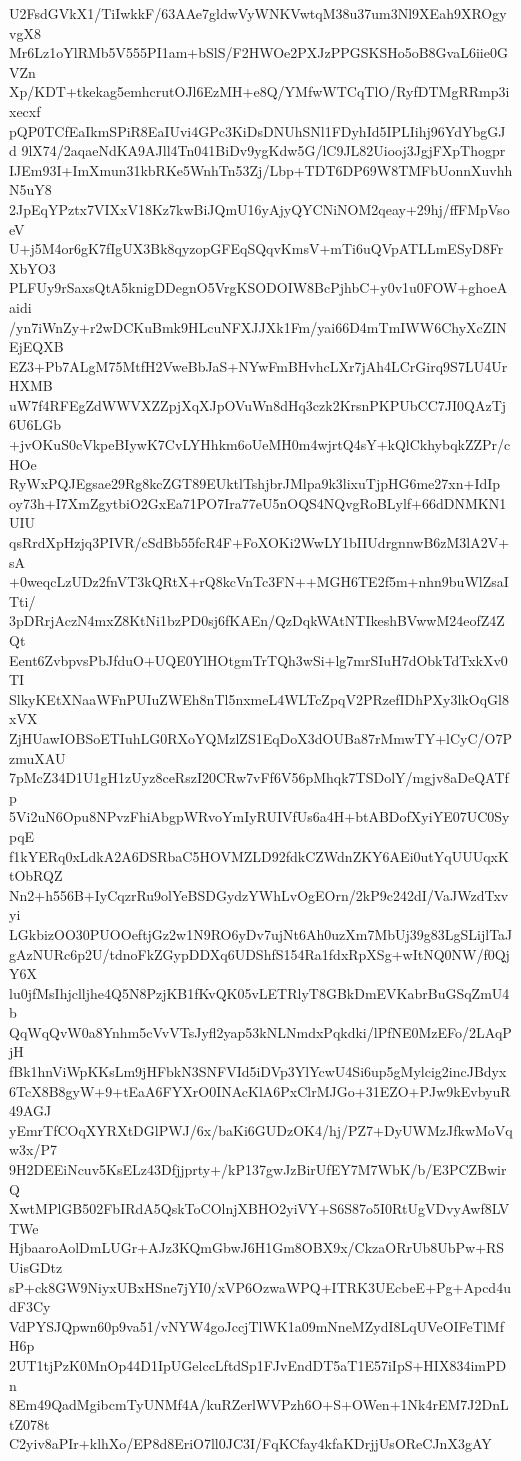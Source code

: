 U2FsdGVkX1/TiIwkkF/63AAe7gldwVyWNKVwtqM38u37um3Nl9XEah9XROgyvgX8
Mr6Lz1oYlRMb5V555PI1am+bSlS/F2HWOe2PXJzPPGSKSHo5oB8GvaL6iie0GVZn
Xp/KDT+tkekag5emhcrutOJl6EzMH+e8Q/YMfwWTCqTlO/RyfDTMgRRmp3ixecxf
pQP0TCfEaIkmSPiR8EaIUvi4GPc3KiDsDNUhSNl1FDyhId5IPLIihj96YdYbgGJd
9lX74/2aqaeNdKA9AJll4Tn041BiDv9ygKdw5G/lC9JL82Uiooj3JgjFXpThogpr
IJEm93I+ImXmun31kbRKe5WnhTn53Zj/Lbp+TDT6DP69W8TMFbUonnXuvhhN5uY8
2JpEqYPztx7VIXxV18Kz7kwBiJQmU16yAjyQYCNiNOM2qeay+29hj/ffFMpVsoeV
U+j5M4or6gK7fIgUX3Bk8qyzopGFEqSQqvKmsV+mTi6uQVpATLLmESyD8FrXbYO3
PLFUy9rSaxsQtA5knigDDegnO5VrgKSODOIW8BcPjhbC+y0v1u0FOW+ghoeAaidi
/yn7iWnZy+r2wDCKuBmk9HLcuNFXJJXk1Fm/yai66D4mTmIWW6ChyXcZINEjEQXB
EZ3+Pb7ALgM75MtfH2VweBbJaS+NYwFmBHvhcLXr7jAh4LCrGirq9S7LU4UrHXMB
uW7f4RFEgZdWWVXZZpjXqXJpOVuWn8dHq3czk2KrsnPKPUbCC7JI0QAzTj6U6LGb
+jvOKuS0cVkpeBIywK7CvLYHhkm6oUeMH0m4wjrtQ4sY+kQlCkhybqkZZPr/cHOe
RyWxPQJEgsae29Rg8kcZGT89EUktlTshjbrJMlpa9k3lixuTjpHG6me27xn+IdIp
oy73h+I7XmZgytbiO2GxEa71PO7Ira77eU5nOQS4NQvgRoBLylf+66dDNMKN1UIU
qsRrdXpHzjq3PIVR/cSdBb55fcR4F+FoXOKi2WwLY1bIIUdrgnnwB6zM3lA2V+sA
+0weqcLzUDz2fnVT3kQRtX+rQ8kcVnTc3FN++MGH6TE2f5m+nhn9buWlZsaITti/
3pDRrjAczN4mxZ8KtNi1bzPD0sj6fKAEn/QzDqkWAtNTIkeshBVwwM24eofZ4ZQt
Eent6ZvbpvsPbJfduO+UQE0YlHOtgmTrTQh3wSi+lg7mrSIuH7dObkTdTxkXv0TI
SlkyKEtXNaaWFnPUIuZWEh8nTl5nxmeL4WLTcZpqV2PRzefIDhPXy3lkOqGl8xVX
ZjHUawIOBSoETIuhLG0RXoYQMzlZS1EqDoX3dOUBa87rMmwTY+lCyC/O7PzmuXAU
7pMcZ34D1U1gH1zUyz8ceRszI20CRw7vFf6V56pMhqk7TSDolY/mgjv8aDeQATfp
5Vi2uN6Opu8NPvzFhiAbgpWRvoYmIyRUIVfUs6a4H+btABDofXyiYE07UC0SypqE
f1kYERq0xLdkA2A6DSRbaC5HOVMZLD92fdkCZWdnZKY6AEi0utYqUUUqxKtObRQZ
Nn2+h556B+IyCqzrRu9olYeBSDGydzYWhLvOgEOrn/2kP9c242dI/VaJWzdTxvyi
LGkbizOO30PUOOeftjGz2w1N9RO6yDv7ujNt6Ah0uzXm7MbUj39g83LgSLijlTaJ
gAzNURc6p2U/tdnoFkZGypDDXq6UDShfS154Ra1fdxRpXSg+wItNQ0NW/f0QjY6X
lu0jfMsIhjclljhe4Q5N8PzjKB1fKvQK05vLETRlyT8GBkDmEVKabrBuGSqZmU4b
QqWqQvW0a8Ynhm5cVvVTsJyfl2yap53kNLNmdxPqkdki/lPfNE0MzEFo/2LAqPjH
fBk1hnViWpKKsLm9jHFbkN3SNFVId5iDVp3YlYcwU4Si6up5gMylcig2incJBdyx
6TcX8B8gyW+9+tEaA6FYXrO0INAcKlA6PxClrMJGo+31EZO+PJw9kEvbyuR49AGJ
yEmrTfCOqXYRXtDGlPWJ/6x/baKi6GUDzOK4/hj/PZ7+DyUWMzJfkwMoVqw3x/P7
9H2DEEiNcuv5KsELz43Dfjjprty+/kP137gwJzBirUfEY7M7WbK/b/E3PCZBwirQ
XwtMPlGB502FbIRdA5QskToCOlnjXBHO2yiVY+S6S87o5I0RtUgVDvyAwf8LVTWe
HjbaaroAolDmLUGr+AJz3KQmGbwJ6H1Gm8OBX9x/CkzaORrUb8UbPw+RSUisGDtz
sP+ck8GW9NiyxUBxHSne7jYI0/xVP6OzwaWPQ+ITRK3UEcbeE+Pg+Apcd4udF3Cy
VdPYSJQpwn60p9va51/vNYW4goJccjTlWK1a09mNneMZydI8LqUVeOIFeTlMfH6p
2UT1tjPzK0MnOp44D1IpUGelccLftdSp1FJvEndDT5aT1E57iIpS+HIX834imPDn
8Em49QadMgibcmTyUNMf4A/kuRZerlWVPzh6O+S+OWen+1Nk4rEM7J2DnLtZ078t
C2yiv8aPIr+klhXo/EP8d8EriO7ll0JC3I/FqKCfay4kfaKDrjjUsOReCJnX3gAY

